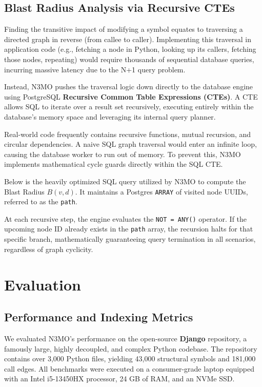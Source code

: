 \documentclass[conference]{IEEEtran}
\begin{document}
\subsection{Blast Radius Analysis via Recursive CTEs}
Finding the transitive impact of modifying a symbol equates to traversing a directed graph in reverse (from callee to caller). Implementing this traversal in application code (e.g., fetching a node in Python, looking up its callers, fetching those nodes, repeating) would require thousands of sequential database queries, incurring massive latency due to the N+1 query problem.

Instead, N3MO pushes the traversal logic down directly to the database engine using PostgreSQL \textbf{Recursive Common Table Expressions (CTEs)}. A CTE allows SQL to iterate over a result set recursively, executing entirely within the database's memory space and leveraging its internal query planner.

Real-world code frequently contains recursive functions, mutual recursion, and circular dependencies. A naive SQL graph traversal would enter an infinite loop, causing the database worker to run out of memory. To prevent this, N3MO implements mathematical cycle guards directly within the SQL CTE. 

Below is the heavily optimized SQL query utilized by N3MO to compute the Blast Radius $B(v, d)$. It maintains a Postgres \texttt{ARRAY} of visited node UUIDs, referred to as the \texttt{path}.

At each recursive step, the engine evaluates the \texttt{NOT = ANY()} operator. If the upcoming node ID already exists in the \texttt{path} array, the recursion halts for that specific branch, mathematically guaranteeing query termination in all scenarios, regardless of graph cyclicity.

\section{Evaluation}

\subsection{Performance and Indexing Metrics}
We evaluated N3MO's performance on the open-source \textbf{Django} repository, a famously large, highly decoupled, and complex Python codebase. The repository contains over 3,000 Python files, yielding 43,000 structural symbols and 181,000 call edges. All benchmarks were executed on a consumer-grade laptop equipped with an Intel i5-13450HX processor, 24 GB of RAM, and an NVMe SSD.
\end{document}
